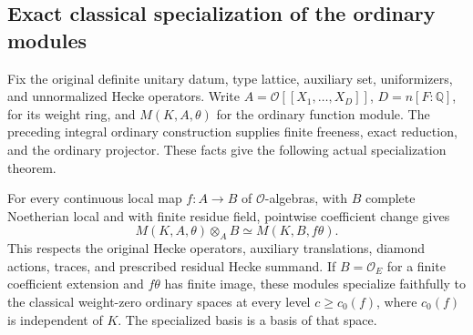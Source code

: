 \subsection{Exact classical specialization of the ordinary modules}
\label{sec:selmer-classical-control}

Fix the original definite unitary datum, type lattice, auxiliary set,
uniformizers, and unnormalized Hecke operators.  Write
\(A=\mathcal O[[X_1,\ldots,X_D]]\), \(D=n[F:\mathbb Q]\), for its
weight ring, and \(M(K,A,\theta)\) for the ordinary function module.
The preceding integral ordinary construction supplies finite freeness,
exact reduction, and the ordinary projector.  These facts give the
following actual specialization theorem.

\begin{proposition}
\label{prop:selmer-classical-control}
For every continuous local map \(f:A\to B\) of \(\mathcal O\)-algebras,
with \(B\) complete Noetherian local and with finite residue field,
pointwise coefficient change gives
\[
 M(K,A,\theta)\otimes_A B\simeq M(K,B,f\theta).
\]
This respects the original Hecke operators, auxiliary translations,
diamond actions, traces, and prescribed residual Hecke summand.
If \(B=\mathcal O_E\) for a finite coefficient extension and \(f\theta\)
has finite image, these modules specialize faithfully to the classical
weight-zero ordinary spaces at every level \(c\geq c_0(f)\), where
\(c_0(f)\) is independent of \(K\).  The specialized basis is a basis
of that space.
\end{proposition}

